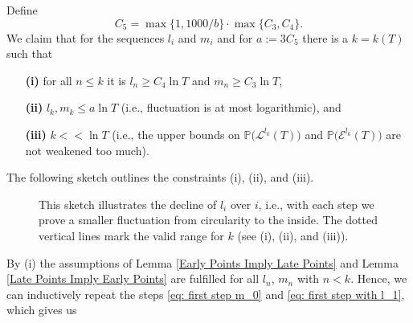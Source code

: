\documentclass[11pt]{article}
\makeatletter
\renewenvironment{proof}[1][\proofname]{
   \par\pushQED{\qed}\normalfont
   \topsep6\p@\@plus6\p@\relax
   \trivlist\item[\hskip\labelsep\bfseries#1\@addpunct{.}]
   \ignorespaces
}{
   \popQED\endtrivlist\@endpefalse
}
\numberwithin{equation}{section}
\makeatother
\begin{document}
\begin{proof}[Proof of Theorem \ref{log fluctuation}]
  Define 
  $$C_5 = \max \{ 1,  1000/b\} \cdot \max \{ C_3, C_4\}.$$ 
  We claim that for the sequences 
  $l_i$ and $m_i$ and for $a := 3C_5$ there is a $k = k(T)$
  such that 
  \begin{itemize}
    \item[\textbf{(i)}] for all $n \leq k$ it is 
      $l_n \geq C_4 \ln T$ and 
      $m_n \geq C_3 \ln T$, 
    \item[\textbf{(ii)}] $l_k, m_k \leq a \ln T$ 
        (i.e., fluctuation is at most logarithmic), and
    \item[\textbf{(iii)}] $k << \ln T$ 
      (i.e., the upper bounds on $\mathbb{P}\big(\mathcal{L}^{l_k}(T)\big)$ 
      and $\mathbb{P}\big(\mathcal{E}^{l_k}(T)\big)$ are not weakened too much).
  \end{itemize} 
  The following sketch outlines the constraints (i), (ii), and (iii).
  \begin{figure}[H] \label{valid vals l_k}
    \captionsetup{width=.8\linewidth}
    \caption{This sketch illustrates the decline of $l_i$ over $i$, i.e., 
      with each step we prove a smaller fluctuation from circularity to the inside.
      The dotted vertical lines mark the valid range for $k$ (see (i), (ii), and (iii)).}
  \end{figure}
  By (i) the assumptions of Lemma \ref{Early Points Imply Late Points}
  and Lemma \ref{Late Points Imply Early Points} are fulfilled for all $l_n$, $m_n$ with $n < k$.
  Hence, we can inductively repeat the steps \eqref{eq: first step m_0} 
  and \eqref{eq: first step with l_1}, which gives us

\end{proof}
\end{document}
